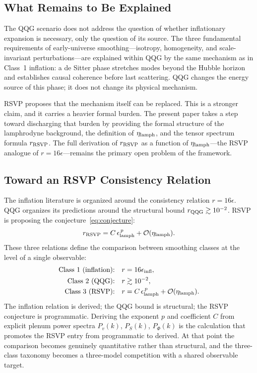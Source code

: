 \documentclass[12pt, a4paper]{article}
\newcommand{\etalamph}{\eta_{\rm lamph}}
\newcommand{\epslamph}{\epsilon_{\rm lamph}}
\newcommand{\rRSVP}{r_{\rm RSVP}}
\newcommand{\rQQG}{r_{\rm QQG}}
\begin{document}
\subsection{What Remains to Be Explained}

The QQG scenario does not address the question of whether inflationary expansion
is necessary, only the question of its source. The three fundamental requirements
of early-universe smoothing---isotropy, homogeneity, and scale-invariant
perturbations---are explained within QQG by the same mechanism as in Class~1
inflation: a de Sitter phase stretches modes beyond the Hubble horizon and
establishes causal coherence before last scattering. QQG changes the energy
source of this phase; it does not change its physical mechanism.

RSVP proposes that the mechanism itself can be replaced. This is a stronger claim,
and it carries a heavier formal burden. The present paper takes a step toward
discharging that burden by providing the formal structure of the lamphrodyne
background, the definition of $\etalamph$, and the tensor spectrum formula
$\rRSVP$. The full derivation of $\rRSVP$ as a function of $\etalamph$---the
RSVP analogue of $r = 16\epsilon$---remains the primary open problem of the
framework.

\subsection{Toward an RSVP Consistency Relation}

The inflation literature is organized around the consistency relation $r =
16\epsilon$. QQG organizes its predictions around the structural bound $\rQQG
\gtrsim 10^{-2}$. RSVP is proposing the conjecture~\eqref{eq:conjecture}:
\begin{equation}
\rRSVP = C\,\epslamph^{\,p} + \mathcal{O}(\etalamph).
\end{equation}
These three relations define the comparison between smoothing classes at the level
of a single observable:
\begin{align}
\text{Class 1 (inflation):} &\quad r = 16\epsilon_{\rm infl}, \\
\text{Class 2 (QQG):} &\quad r \gtrsim 10^{-2}, \\
\text{Class 3 (RSVP):} &\quad r = C\,\epslamph^{\,p} + \mathcal{O}(\etalamph).
\end{align}
The inflation relation is derived; the QQG bound is structural; the RSVP conjecture
is programmatic. Deriving the exponent $p$ and coefficient $C$ from explicit plenum
power spectra $P_v(k)$, $P_S(k)$, $P_\Phi(k)$ is the calculation that promotes
the RSVP entry from programmatic to derived. At that point the comparison becomes
genuinely quantitative rather than structural, and the three-class taxonomy becomes
a three-model competition with a shared observable target.
\end{document}
